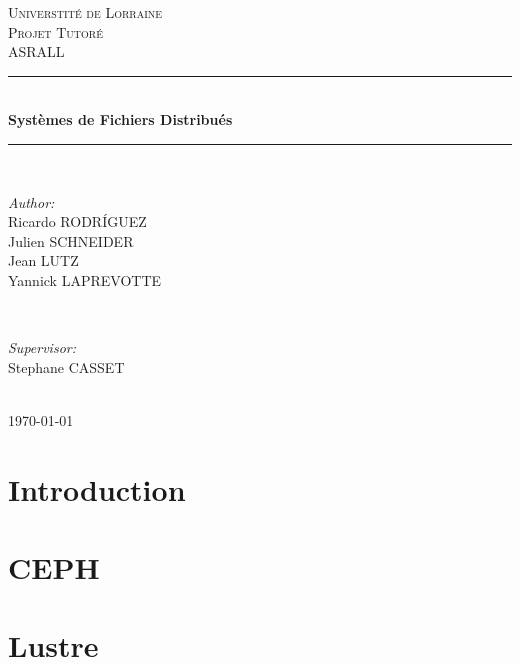 \documentclass[12pt]{article}
\begin{document}
\begin{titlepage}
\newcommand{\HRule}{\rule{\linewidth}{0.5mm}}
\center 

\textsc{\LARGE Universtité de Lorraine}\\[1.5cm] 
\textsc{\Large Projet Tutoré}\\[0.5cm]
\textsc{\large ASRALL}\\[0.5cm]

\HRule \\[0.4cm]
{ \huge \bfseries Systèmes de Fichiers Distribués}\\[0.4cm] 
\HRule \\[1.5cm]

\begin{minipage}{0.4\textwidth}
\begin{flushleft} \large
\emph{Author:}\\
Ricardo \textsc{RODRÍGUEZ}\\
Julien \textsc{SCHNEIDER}\\
Jean \textsc{LUTZ}\\
Yannick \textsc{LAPREVOTTE}\\
\end{flushleft}
\end{minipage}
~
\begin{minipage}{0.4\textwidth}
\begin{flushright} \large
\emph{Supervisor:} \\
 Stephane \textsc{CASSET} 
\end{flushright}
\end{minipage}\\[4cm]

{\large \today}\\[3cm] 

\vfill 
\end{titlepage}


\tableofcontents 

\newpage 

\section{Introduction} 
\section{CEPH}
\newpage
\section{Lustre}
\end{document}
